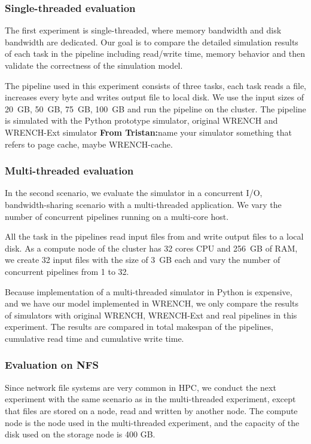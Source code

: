 \documentclass[conference]{IEEEtran}
\newcommand{\tristan}[1]{\color{orange}\textbf{From Tristan:}#1\color{black}}
\begin{document}
			\subsubsection{Single-threaded evaluation}
			
			The first experiment is single-threaded, where memory bandwidth 
			and disk bandwidth are dedicated. 
			Our goal is to compare the detailed simulation results of each task 
			in the pipeline including read/write time, memory behavior and 
			then validate the correctness of the simulation model. 

			The pipeline used in this experiment consists of three tasks, 
			each task reads a file, increases every byte and writes output file 
			to local disk. 
			We use the input sizes of 20~GB, 50~GB, 75~GB, 100~GB and run 
			the pipeline on the cluster.
			The pipeline is simulated with the Python prototype simulator, 
			original WRENCH and WRENCH-Ext simulator \tristan{name your simulator something 
			that refers to page cache, maybe WRENCH-cache}. 
			
			\subsubsection{Multi-threaded evaluation}

			In the second scenario, we evaluate the simulator in a concurrent I/O, 
			bandwidth-sharing scenario with a multi-threaded application. 			
			We vary the number of concurrent pipelines running on a multi-core host.  
			
			All the task in the pipelines read input files from and write output files 
			to a local disk. 
			As a compute node of the cluster has 32 cores CPU and 256~GB of RAM,  
			we create 32 input files with the size of 3~GB each and vary the number of 
			concurrent pipelines from 1 to 32. 
			
			Because implementation of a multi-threaded simulator in Python is 
			expensive, and we have our model implemented in WRENCH, 
			we only compare the results of simulators with original WRENCH, 
			WRENCH-Ext and real pipelines in this experiment. 
			The results are compared in total makespan of the pipelines, 
			cumulative read time and cumulative write time.
			
			\subsubsection{Evaluation on NFS}
			
		    Since network file systems are very common in HPC, we conduct 
		    the next experiment with the same scenario as in the multi-threaded experiment, 
		    except that files are stored on a node, read and written by another node. 
		    The compute node is the node used in the multi-threaded experiment, 
		    and the capacity of the disk used on the storage node is 400 GB.
		    
\end{document}
